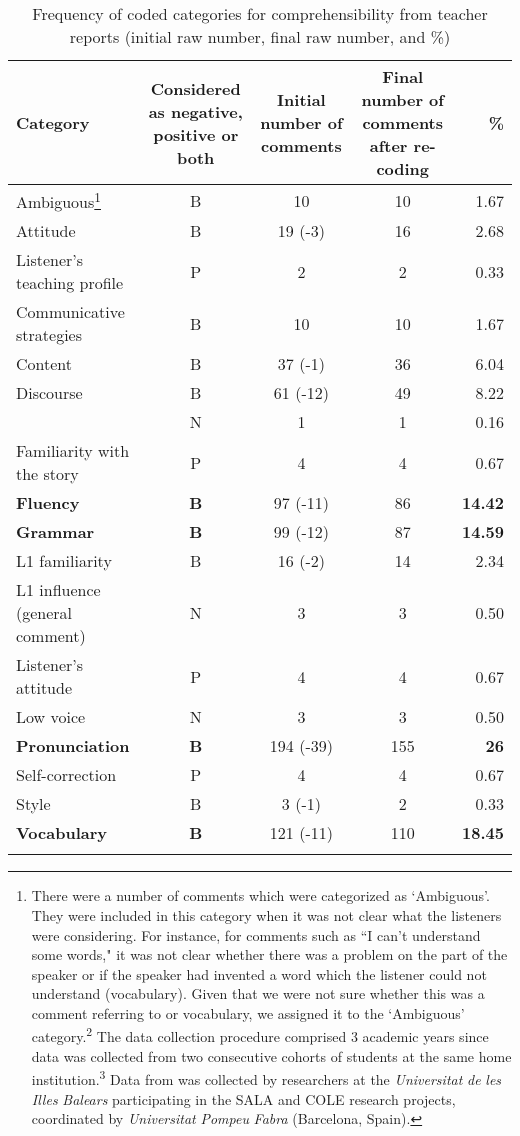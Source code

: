 \documentclass[output=paper]{langsci/langscibook}
\begin{document}
\begin{table}
\caption{Frequency of coded categories for comprehensibility from teacher reports (initial raw number, final raw number, and \%)}
\label{tab:delrio:2}
\small
\begin{tabularx}{\textwidth}{l@{}SSSr}
\lsptoprule
\bfseries Category & \bfseries Considered as negative, positive or both & \bfseries Initial number of comments & \bfseries Final number of comments after re-coding & \bfseries \%\\
\midrule
Ambiguous\footnote{ There were a number of comments which were categorized as ‘Ambiguous’. They were included in this category when it was not clear what the listeners were considering. For instance, for comments such as “I can't understand some words," it was not clear whether there was a  problem on the part of the speaker or if the speaker had invented a word which the listener could not understand (vocabulary). Given that we were not sure  whether this was a comment referring to  or vocabulary, we assigned it to the ‘Ambiguous’ category.\textsuperscript{2} The data collection procedure comprised 3 academic years since data was collected from two consecutive cohorts of students at the same home institution.\textsuperscript{3} Data from  was collected by researchers at the \textit{Universitat} \textit{de} \textit{les} \textit{Illes} \textit{Balears} participating in the SALA and COLE research projects, coordinated by \textit{Universitat} \textit{Pompeu} \textit{Fabra} (Barcelona, Spain).} & B & 10 & 10 & 1.67\\
Attitude & B & 19  (-3) & 16 & 2.68\\
Listener’s teaching profile & P & 2 & 2 & 0.33\\
Communicative strategies & B & 10 & 10 & 1.67\\
Content & B & 37  (-1) & 36 & 6.04\\
Discourse & B & 61  (-12) & 49 & 8.22\\
  & N & 1 & 1 & 0.16\\
Familiarity with the story & P & 4 & 4 & 0.67\\
\textbf{Fluency} & \textbf{B} & 97  (-11) & 86 & \textbf{14.42}\\
\textbf{Grammar} & \textbf{B} & 99  (-12) & 87 & \textbf{14.59}\\
L1 familiarity & B & 16  (-2) & 14 & 2.34\\
L1 influence (general comment) & N & 3 & 3 & 0.50\\
Listener’s attitude & P & 4 & 4 & 0.67\\
Low voice & N & 3 & 3 & 0.50\\
\textbf{Pronunciation} & \textbf{B} & 194   (-39) & 155 & \textbf{26}\\
Self-correction & P & 4 & 4 & 0.67\\
Style & B & 3    (-1) & 2 & 0.33\\
\textbf{Vocabulary} & \textbf{B} & 121   (-11) & 110 & \textbf{18.45}\\
\lspbottomrule
\end{tabularx} 
\end{table}
\end{document}
